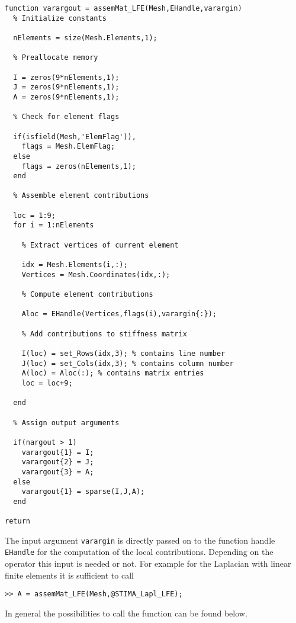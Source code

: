 \begin{lstlisting}
function varargout = assemMat_LFE(Mesh,EHandle,varargin)
  % Initialize constants
  
  nElements = size(Mesh.Elements,1);
  
  % Preallocate memory
  
  I = zeros(9*nElements,1);  
  J = zeros(9*nElements,1);  
  A = zeros(9*nElements,1); 
  
  % Check for element flags
  
  if(isfield(Mesh,'ElemFlag')),
    flags = Mesh.ElemFlag; 
  else
    flags = zeros(nElements,1);
  end

  % Assemble element contributions
  
  loc = 1:9;
  for i = 1:nElements
    
    % Extract vertices of current element
    
    idx = Mesh.Elements(i,:);
    Vertices = Mesh.Coordinates(idx,:);
      
    % Compute element contributions
    
    Aloc = EHandle(Vertices,flags(i),varargin{:});
   
    % Add contributions to stiffness matrix
    
    I(loc) = set_Rows(idx,3); % contains line number
    J(loc) = set_Cols(idx,3); % contains column number
    A(loc) = Aloc(:); % contains matrix entries
    loc = loc+9;
    
  end
  
  % Assign output arguments
  
  if(nargout > 1)
    varargout{1} = I;
    varargout{2} = J;
    varargout{3} = A;
  else
    varargout{1} = sparse(I,J,A);
  end
  
return
\end{lstlisting}

The input argument \texttt{varargin} is directly passed on to the function handle {\tt EHandle} for the computation of the local contributions. Depending on the operator this input is needed or not. For example for the Laplacian with linear finite elements it is sufficient to call

\noindent \verb!>> A = assemMat_LFE(Mesh,@STIMA_Lapl_LFE);!

In general the possibilities to call the function can be found below.

 \\
 \\
 \\

